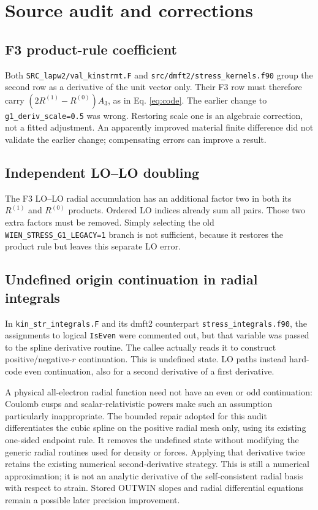 \documentclass[11pt]{article}
\begin{document}
\section{Source audit and corrections}
\subsection{F3 product-rule coefficient}
Both \texttt{SRC\_lapw2/val\_kinstrmt.F} and \texttt{src/dmft2/stress\_kernels.f90} group the second row as a derivative of the unit vector only. Their F3 row must therefore carry $(2R^{(1)}-R^{(0)})A_3$, as in Eq. \eqref{eq:code}. The earlier change to \texttt{g1\_deriv\_scale=0.5} was wrong. Restoring scale one is an algebraic correction, not a fitted adjustment. An apparently improved material finite difference did not validate the earlier change; compensating errors can improve a result.

\subsection{Independent LO--LO doubling}
The F3 LO--LO radial accumulation has an additional factor two in both its $R^{(1)}$ and $R^{(0)}$ products. Ordered LO indices already sum all pairs. Those two extra factors must be removed. Simply selecting the old \texttt{WIEN\_STRESS\_G1\_LEGACY=1} branch is not sufficient, because it restores the product rule but leaves this separate LO error.

\subsection{Undefined origin continuation in radial integrals}
In \texttt{kin\_str\_integrals.F} and its dmft2 counterpart \texttt{stress\_integrals.f90}, the assignments to logical \texttt{IsEven} were commented out, but that variable was passed to the spline derivative routine. The callee actually reads it to construct positive/negative-$r$ continuation. This is undefined state. LO paths instead hard-code even continuation, also for a second derivative of a first derivative.

A physical all-electron radial function need not have an even or odd continuation: Coulomb cusps and scalar-relativistic powers make such an assumption particularly inappropriate. The bounded repair adopted for this audit differentiates the cubic spline on the positive radial mesh only, using its existing one-sided endpoint rule. It removes the undefined state without modifying the generic radial routines used for density or forces. Applying that derivative twice retains the existing numerical second-derivative strategy. This is still a numerical approximation; it is not an analytic derivative of the self-consistent radial basis with respect to strain. Stored OUTWIN slopes and radial differential equations remain a possible later precision improvement.
\end{document}
